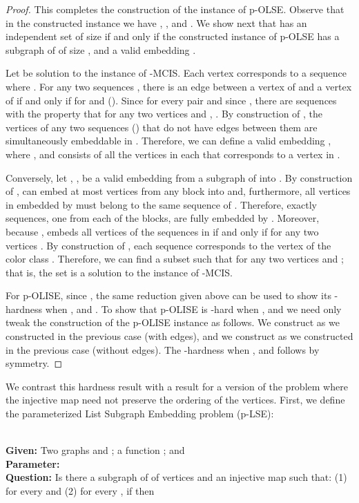 \documentclass[11pt]{article}
\newcommand{\paramproblem}[4]{\noindent {\sc #1}
\\
{\bf Given:} #2\\
{\bf Parameter:} #3\\
{\bf Question:} #4}
\newcommand{\NP}{\mbox{}}
\begin{document}
\begin{proof}
This completes the construction of the instance of p-OLSE. Observe that in the constructed instance we have , , and . We show next that  has an independent set of size  if and only if the constructed instance of p-OLSE has a subgraph  of  of size , and a valid embedding
.

Let  be solution to the instance  of \textsc{-MCIS}. Each vertex  corresponds to a
sequence  where .
For any two sequences , there is an edge
between a vertex of  and a vertex of  if and only if
 for  and  (). Since for
every pair  and since
, there are  sequences  with the property
that for any two vertices  and
, .
By construction of , the vertices of any two sequences 
() that do not have edges between them are simultaneously embeddable in . Therefore,
we can define a valid embedding , where , and  consists of all the vertices in each 
that corresponds to a vertex in .

Conversely, let , , be a valid embedding
from a subgraph  of  into .  By construction of ,  can embed at most 
vertices from any block  into  and, furthermore, all vertices
in  embedded by  must belong to the same sequence  of
. Therefore, exactly  sequences, one from each of the  blocks, are fully embedded by . Moreover, because ,  embeds all  vertices of
the  sequences  in  if and only if for any two vertices
.
By construction of , each sequence  corresponds to the 
vertex of the color class . Therefore, we can find a subset
 such that for any two vertices  and ; that is, the set
 is a solution to the instance  of \textsc{-MCIS}.

 For p-OLISE, since , the same reduction given above can be used to show its -hardness when ,  and .  To show that p-OLISE is \NP-hard when ,  and  we need only tweak the construction of the p-OLISE instance as follows.  We construct  as we constructed  in the previous case (with edges), and we construct  as we constructed  in the previous case (without edges). The \NP-hardness when ,  and  follows by symmetry.
\end{proof}

We contrast this hardness result with a result for a version of the problem where the injective map need not preserve the ordering of the vertices.  First, we define the parameterized {\sc List Subgraph Embedding} problem (p-LSE):

\paramproblem{} {Two graphs  and ; a function ; and }{}{Is there a subgraph  of  of  vertices and an injective map  such that: (1)  for every  and (2) for every , if  then } \\
\end{document}
